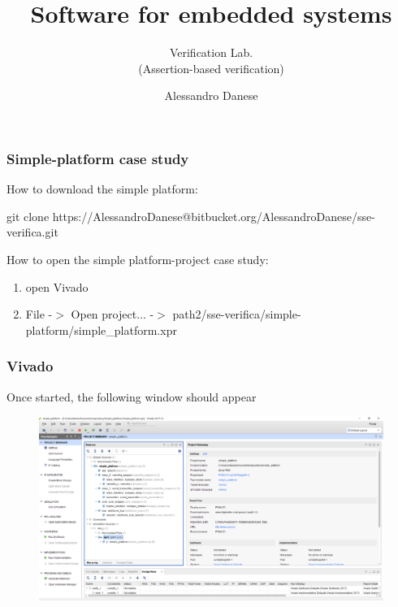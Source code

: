 \documentclass{beamer}
\title[About Beamer] %
{Software for embedded systems}
\subtitle{Verification Lab.\\ (Assertion-based verification)}
\author{Alessandro Danese}
\institute{University of Verona, Verona, Italy
\\alessandro.danese@univr.it}
\begin{document}
 
\frame{\titlepage}
 
\begin{frame}
\frametitle{Simple-platform case study}

How to download the simple platform:
\begin{block}{}
	git clone https://AlessandroDanese@bitbucket.org/AlessandroDanese/sse-verifica.git
\end{block}

How to open the simple platform-project case study:
\begin{block}{}
\begin{enumerate}
	\item 
	open Vivado
	\item
	File -$>$ Open project... -$>$ path2/sse-verifica/simple-platform/simple\_platform.xpr
\end{enumerate}
\end{block}

\end{frame}
 
\begin{frame}
\frametitle{Vivado}
Once started, the following window should appear

\begin{figure}
	\centering
	\includegraphics[width=0.9\columnwidth]{figures/vivado_sp.png}
\end{figure}

\end{frame}
\end{document}
